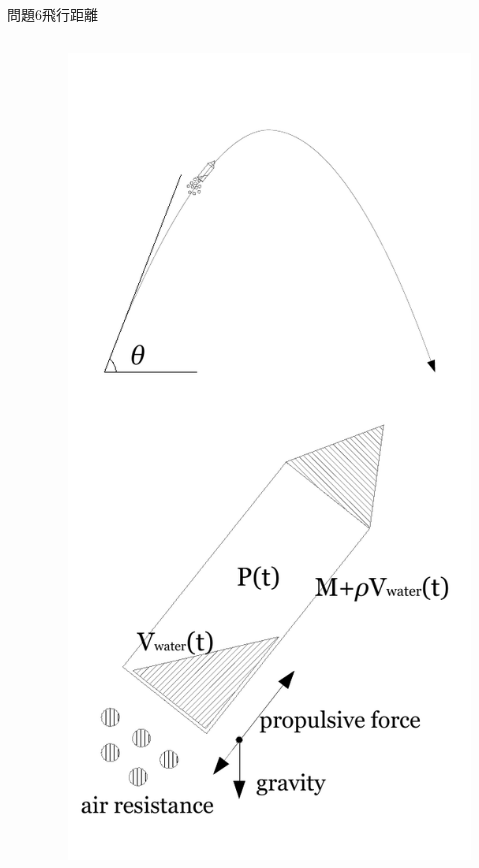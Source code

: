 \documentclass[dvipdfmx]{beamer}
\begin{document}
\begin{frame}{問題6}{飛行距離}
\begin{columns}[t]
\begin{column}{0.7\textwidth}
\end{column}
\begin{column}{0.3\textwidth}
\begin{figure}[htbp]
    \centering
    \includegraphics[bb=0mm 0mm 100.0mm 170.0mm, scale=0.35, type=pdf]{img/problem6.pdf}
\end{figure}
\end{column}
\end{columns}
\end{frame}
\end{document}
